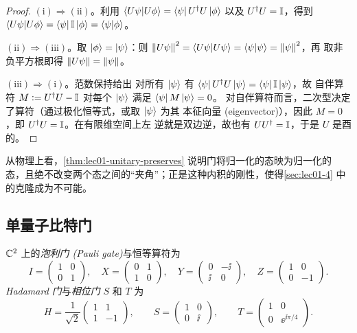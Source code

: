 \begin{proof}
$(\mathrm{i})\Rightarrow(\mathrm{ii})$。利用
$\braket{U\psi|U\phi}=\bra{\psi}U^{\dagger} U\ket{\phi}$ 以及 $U^{\dagger} U=\mathbb{I}$，得到
$\braket{U\psi|U\phi}=\bra{\psi}\mathbb{I}\ket{\phi}=\braket{\psi|\phi}$。

$(\mathrm{ii})\Rightarrow(\mathrm{iii})$。取 $\ket{\phi}=\ket{\psi}$：则
$\left\lVert U\psi \right\rVert^{2}=\braket{U\psi|U\psi}=\braket{\psi|\psi}=\left\lVert \psi \right\rVert^{2}$，再
取非负平方根即得 $\left\lVert U\psi \right\rVert=\left\lVert \psi \right\rVert$。

$(\mathrm{iii})\Rightarrow(\mathrm{i})$。范数保持给出
对所有 $\ket{\psi}$ 有 $\bra{\psi}U^{\dagger} U\ket{\psi}=\bra{\psi}\mathbb{I}\ket{\psi}$，故
自伴算符 $M\vcentcolon= U^{\dagger} U-\mathbb{I}$ 对每个 $\ket{\psi}$ 满足 $\bra{\psi}M\ket{\psi}=0$。
对自伴算符而言，二次型决定了算符（通过极化恒等式，或取 $\ket{\psi}$ 为其
本征向量 (eigenvector)），因此 $M=0$，即 $U^{\dagger} U=\mathbb{I}$。在有限维空间上左
逆就是双边逆，故也有 $UU^{\dagger}=\mathbb{I}$，于是 $U$ 是酉的。
\end{proof}

从物理上看，\cref{thm:lec01-unitary-preserves} 说明门将归一化的态映为归一化的
态，且绝不改变两个态之间的``夹角''；正是这种内积的刚性，使得\cref{sec:lec01-4}
中的克隆成为不可能。

\subsection{单量子比特门}

\begin{definition}\label{def:lec01-gates}
$\mathbb{C}^{2}$ 上的\emph{泡利门 (Pauli gate)}与恒等算符为
\[
  I=\begin{pmatrix}1&0\\0&1\end{pmatrix},\quad
  X=\begin{pmatrix}0&1\\1&0\end{pmatrix},\quad
  Y=\begin{pmatrix}0&-\ii\\\ii&0\end{pmatrix},\quad
  Z=\begin{pmatrix}1&0\\0&-1\end{pmatrix}.
\]
\emph{Hadamard 门}与\emph{相位门} $S$ 和 $T$ 为
\[
  H=\frac{1}{\sqrt{2}}\begin{pmatrix}1&1\\1&-1\end{pmatrix},\qquad
  S=\begin{pmatrix}1&0\\0&\ii\end{pmatrix},\qquad
  T=\begin{pmatrix}1&0\\0&\ee^{\ii\pi/4}\end{pmatrix}.
\]
\end{definition}

